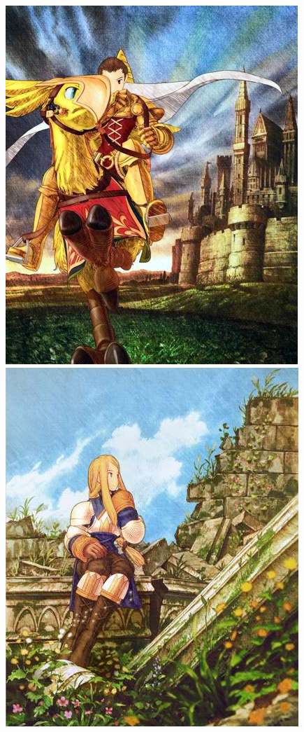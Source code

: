 \includegraphics[width=\columnwidth]{./art/worldbook/delita2.jpg} 	
%
\newpage
%
\includegraphics[width=\columnwidth]{./art/worldbook/agrias.jpg}

